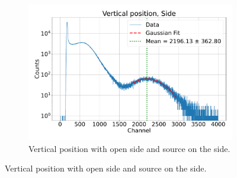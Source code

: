 \begin{figure}[hp]
\begin{subfigure}[t]{0.48\textwidth}
        \includegraphics[width=\textwidth]{fig/lightyield/ej200/bps_ej200_side.pdf}
        \caption{Vertical position with open side and source on the side.}\label{fig:lightyield:ej200:measurement:2}
    \end{subfigure}

    \vspace{0.5cm}



\end{figure}
